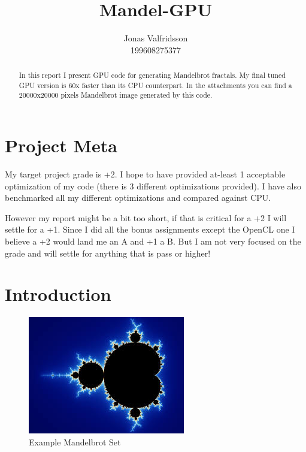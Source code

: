 \documentclass{article}
\title{Mandel-GPU}
\date{}
\author{Jonas Valfridsson\\199608275377}
\begin{document}
\maketitle

\begin{abstract}
  In this report I present GPU code for generating Mandelbrot fractals. My final tuned GPU
  version is 60x faster than its CPU counterpart. In the attachments you can find a
  20000x20000 pixels Mandelbrot image generated by this code.
\end{abstract}
\tableofcontents
\newpage

\section{Project Meta}%
\label{sec:project_meta}


My target project grade is +2. I hope to have provided at-least 1 acceptable optimization of
my code (there is 3 different optimizations provided). I have also benchmarked all my
different optimizations and compared against CPU.

However my report might be a bit too short, if that is critical for a +2 I will settle
for a +1. Since I did all the bonus assignments except the OpenCL one I believe a +2 would
land me an A and +1 a B. But I am not very focused on the grade and will settle for anything
that is pass or higher! 



\section{Introduction}%
\label{sec:introduction}


\begin{figure}
  \centering
  \includegraphics[width=0.6\linewidth]{external-images/mandelbrot.jpeg}
  \caption{Example Mandelbrot Set}
  \label{fig:mandelbrot}
\end{figure}
\end{document}
